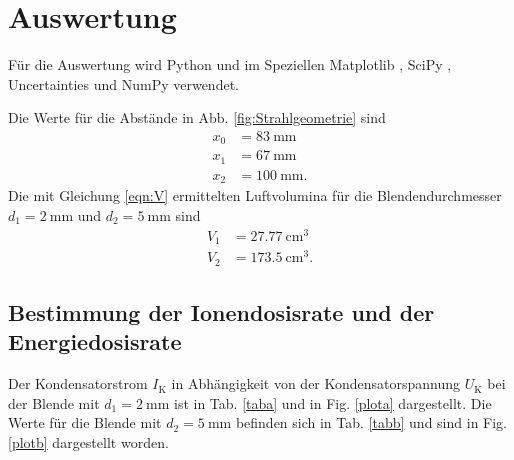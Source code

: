 \section{Auswertung}
\label{sec:Auswertung}

Für die Auswertung wird Python und im Speziellen
Matplotlib \cite{matplotlib}, SciPy \cite{scipy},
Uncertainties \cite{uncertainties} und NumPy \cite{numpy} verwendet.

\noindent Die Werte für die Abstände in Abb. \ref{fig:Strahlgeometrie} sind
\begin{align*}
    x_0 &= \SI{83}{\milli\meter} \\
    x_1 &= \SI{67}{\milli\meter} \\
    x_2 &= \SI{100}{\milli\meter}.
\end{align*}
Die mit Gleichung \eqref{eqn:V} ermittelten Luftvolumina
für die Blendendurchmesser $d_1 = \SI{2}{\milli\meter}$ und
$d_2 = \SI{5}{\milli\meter}$ sind
\begin{align*}
    V_1 &= \SI{27.77}{\centi\meter\cubed} \\ 
    V_2 &= \SI{173.5}{\centi\meter\cubed}.  
\end{align*}


\subsection{Bestimmung der Ionendosisrate und der Energiedosisrate}

Der Kondensatorstrom $I_\text{K}$ in Abhängigkeit von der
Kondensatorspannung $U_\text{K}$ bei der Blende mit
$d_1 = \SI{2}{\milli\meter}$ ist in Tab. \ref{taba} und in Fig. \ref{plota}
dargestellt. Die Werte für die Blende mit 
$d_2 = \SI{5}{\milli\meter}$ befinden sich in Tab. \ref{tabb} und sind in 
Fig. \ref{plotb} dargestellt worden.





